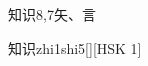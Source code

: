 \begin{entry}{知识}{8,7}{⽮、⾔}
  \begin{phonetics}{知识}{zhi1shi5}[][HSK 1]
  \end{phonetics}
\end{entry}
